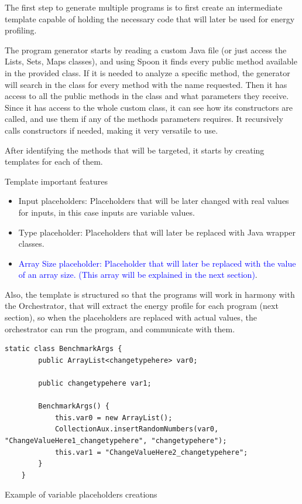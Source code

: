 The first step to generate multiple programs is to first create an intermediate template capable of holding the necessary code that will later be used for energy profiling.

The program generator starts by reading a custom Java file (or just access the Lists, Sets, Maps classes), and using Spoon it finds every public method available in the provided class. If it is needed to analyze a specific method, the generator will search in the class for every method with the name requested. Then it has access to all the public methods in the class and what parameters they receive.
Since it has access to the whole custom class, it can see how its constructors are called, and use them if any of the methods parameters requires. It recursively calls constructors if needed, making it very versatile to use. 

After identifying the methods that will be targeted, it starts by creating templates for each of them. 

Template important features

\begin{itemize}

  \item Input placeholders: Placeholders that will be later changed with real values for inputs, in this case inputs are variable values. 

  \item Type placeholder: Placeholders that will later be replaced with Java wrapper classes.
  
  \item \textcolor{blue}{Array Size placeholder: Placeholder that will later be replaced with the value of an array size. (This array will be explained in the next section)}. 

\end{itemize}

Also, the template is structured so that the programs will work in harmony with the Orchestrator, that will extract the energy profile for each program (next section), so when the placeholders are replaced with actual values, the orchestrator can run the program, and communicate with them.

\begin{listing}[H]
\begin{verbatim}
static class BenchmarkArgs {
        public ArrayList<changetypehere> var0;

        public changetypehere var1;

        BenchmarkArgs() {
            this.var0 = new ArrayList();
            CollectionAux.insertRandomNumbers(var0, "ChangeValueHere1_changetypehere", "changetypehere");
            this.var1 = "ChangeValueHere2_changetypehere";
        }
    }
\end{verbatim}
\caption{Example of variable placeholders creations}            
\label{lst:var_placeholders}
\end{listing}


